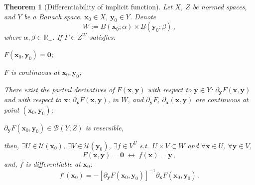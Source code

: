 \documentclass[openany]{book}
\theoremstyle{plain}
\newtheorem{theorem}{Theorem}[section] %
\theoremstyle{definition}
\newcommand*{\bv}{\boldsymbol} %
\newcommand*{\IFF}{\;\leftrightarrow\;} %
\begin{document}
\begin{theorem}[Differentiability of implicit function]
	\label{theorem: differentiability of implicit function}
	Let $X$, $Z$ be normed spaces, and $Y$ be a Banach space.
	$\bv x_0 \in X$, $\bv y_0 \in Y$. Denote
	\begin{equation*}
		W := B(\bv x_0; \alpha) \times B(\bv y_0; \beta)\,,
	\end{equation*}
	where $\alpha, \beta \in \mathbb R_+$.
	If $F \in Z^W$ satisfies:
	\begin{conditionlist}[label=\alph*)]
		\item $F(\bv x_0, \bv y_0) = \bv 0$;
		\item $F$ is continuous at $\bv x_0, \bv y_0$; 
		\item There exist the partial derivatives of $F(\bv x, \bv y)$ with respect to $\bv y \in Y$: $\partial_{\bv y} F(\bv x, \bv y)$ and with respect to $\bv x$: $\partial_{\bv x} F(\bv x, \bv y)$, in $W$, and $\partial_{\bv y} F$, $\partial_{\bv x}(\bv x, \bv y)$ are continuous at point $(\bv x_0, \bv y_0)$;
		\item $\partial_{\bv y} F(\bv x_0, \bv y_0) \in \mathcal B(Y; Z)$ is reversible,
	\end{conditionlist}
	then, $\exists U \in \mathscr U(\bv x_0)$, $\exists V \in \mathscr U(\bv y_0)$, $\exists f \in V^U$ s.t.\ $U \times V \subset W$ and $\forall \bv x \in U$, $\forall \bv y \in V$, 
	\begin{equation*}
		F(\bv x, \bv y) = \bv 0
		\IFF
		f(\bv x) = \bv y\,,
	\end{equation*}
	and, $f$ is differentiable at $\bv x_0$:
	\begin{equation}
		\label{equation: differential of implicit function}
		f'(\bv x_0) = - [\partial_{\bv y} F(\bv x_0, \bv y_0)]^{-1} \partial_{\bv x} F(\bv x_0, \bv y_0)\,.
	\end{equation}
\end{theorem}
\end{document}
